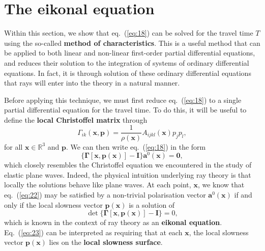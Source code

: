 \section*{The eikonal equation}

Within this section, we show that eq.~(\ref{eq:18}) can be solved for the travel time $T$ using the so-called \textbf{method of characteristics}. 
This is a useful method that can be applied to both linear and non-linear first-order partial differential equations, 
and reduces their solution to the integration of systems of ordinary differential equations. In fact, it is through 
solution of these ordinary differential equations that rays will enter into the theory in a natural manner.

Before applying this technique, we must first reduce eq.~(\ref{eq:18}) to a single partial differential equation for the travel time. 
To do this, it will be useful to define the \textbf{local Christoffel matrix} through
\begin{equation}
\Gamma_{ik}(\mathbf{x},\mathbf{p})=\frac{1}{\rho(\mathbf{x})}A_{ijkl}(\mathbf{x})p_{j}p_{l},
\label{eq:21}
\end{equation}
for all $\mathbf{x}\in\mathbb{R}^{3}$ and $\mathbf{p}$. We can then write eq.~(\ref{eq:18}) in the form
\begin{equation}
\{\bm{\Gamma}[\mathbf{x},\mathbf{p}(\mathbf{x})]-\mathbf{I}\}\mathbf{a}^{0}(\mathbf{x})=\mathbf{0},
\label{eq:22}
\end{equation}
which closely resembles the Christoffel equation we encountered in the study of elastic plane waves. Indeed, 
the physical intuition underlying ray theory is that locally the solutions behave like plane waves.
 At each point, $\mathbf{x}$, we know that eq.~(\ref{eq:22}) may be satisfied by a non-trivial polarisation vector 
 $\mathbf{a}^{0}(\mathbf{x})$ if and only if the local slowness vector $\mathbf{p}(\mathbf{x})$ is a solution of
\begin{equation}
\det\{\bm{\Gamma}[\mathbf{x},\mathbf{p}(\mathbf{x})]-\mathbf{I}\}=0,
\label{eq:23}
\end{equation}
which is known in the context of ray theory as an \textbf{eikonal equation}. Eq.~(\ref{eq:23}) can be interpreted as requiring
 that at each $\mathbf{x}$, the local slowness vector $\mathbf{p}(\mathbf{x})$ lies on the \textbf{local slowness surface}.


